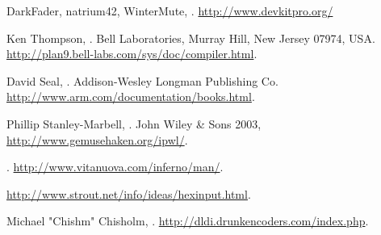 \documentclass[11pt]{p9article}
\newcommand{\hrefx}[1]{\href{#1}{#1}} %
\begin{document}
\begin{thebibliography}{1}
	DarkFader, natrium42, WinterMute, 
	.
	\newblock \hrefx{http://www.devkitpro.org/}
	
	Ken Thompson,
	.
	\newblock Bell Laboratories, Murray Hill, New Jersey 07974, USA.
	\newblock \hrefx{http://plan9.bell-labs.com/sys/doc/compiler.html}.

	David Seal,
	.
	\newblock Addison-Wesley Longman Publishing Co.
	\newblock \hrefx{http://www.arm.com/documentation/books.html}.
	
	Phillip Stanley-Marbell,
	.
	\newblock John Wiley \& Sons 2003,
	\newblock \hrefx{http://www.gemusehaken.org/ipwl/}.

	.
	\newblock \hrefx{http://www.vitanuova.com/inferno/man/}.

	\newblock \hrefx{http://www.strout.net/info/ideas/hexinput.html}.

	Michael "Chishm" Chisholm,
	.
	\newblock \hrefx{http://dldi.drunkencoders.com/index.php}.
	
\end{thebibliography}
\end{document}
